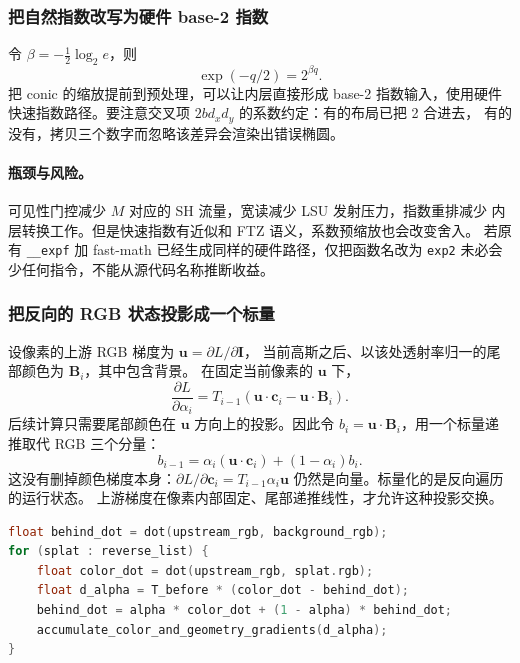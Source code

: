 \subsubsection{把自然指数改写为硬件 base-2 指数}

令 $\beta=-\tfrac12\log_2 e$，则
\begin{equation}
 \exp(-q/2)=2^{\beta q}.
\end{equation}
把 conic 的缩放提前到预处理，可以让内层直接形成 base-2 指数输入，使用硬件
快速指数路径。要注意交叉项 $2bd_xd_y$ 的系数约定：有的布局已把 2 合进去，
有的没有，拷贝三个数字而忽略该差异会渲染出错误椭圆。

\paragraph{瓶颈与风险。}
可见性门控减少 $M$ 对应的 SH 流量，宽读减少 LSU 发射压力，指数重排减少
内层转换工作。但是快速指数有近似和 FTZ 语义，系数预缩放也会改变舍入。
若原有 \texttt{\_\_expf} 加 fast-math 已经生成同样的硬件路径，仅把函数名改为
\texttt{exp2} 未必会少任何指令，不能从源代码名称推断收益。

\subsubsection{把反向的 RGB 状态投影成一个标量}

设像素的上游 RGB 梯度为 $\boldsymbol u=\partial L/\partial\boldsymbol I$，
当前高斯之后、以该处透射率归一的尾部颜色为 $\boldsymbol B_i$，其中包含背景。
在固定当前像素的 $\boldsymbol u$ 下，
\begin{equation}
 \frac{\partial L}{\partial\alpha_i}
 =T_{i-1}\left(\boldsymbol u\cdot\boldsymbol c_i
              -\boldsymbol u\cdot\boldsymbol B_i\right).
\end{equation}
后续计算只需要尾部颜色在 $\boldsymbol u$ 方向上的投影。因此令
$b_i=\boldsymbol u\cdot\boldsymbol B_i$，用一个标量递推取代 RGB 三个分量：
\begin{equation}
 b_{i-1}=\alpha_i(\boldsymbol u\cdot\boldsymbol c_i)
                  +(1-\alpha_i)b_i.
\end{equation}
这没有删掉颜色梯度本身：$\partial L/\partial\boldsymbol c_i
=T_{i-1}\alpha_i\boldsymbol u$ 仍然是向量。标量化的是反向遍历的运行状态。
上游梯度在像素内部固定、尾部递推线性，才允许这种投影交换。

\begin{lstlisting}[language=C++,basicstyle=\ttfamily\small,breaklines=true]
float behind_dot = dot(upstream_rgb, background_rgb);
for (splat : reverse_list) {
    float color_dot = dot(upstream_rgb, splat.rgb);
    float d_alpha = T_before * (color_dot - behind_dot);
    behind_dot = alpha * color_dot + (1 - alpha) * behind_dot;
    accumulate_color_and_geometry_gradients(d_alpha);
}
\end{lstlisting}

